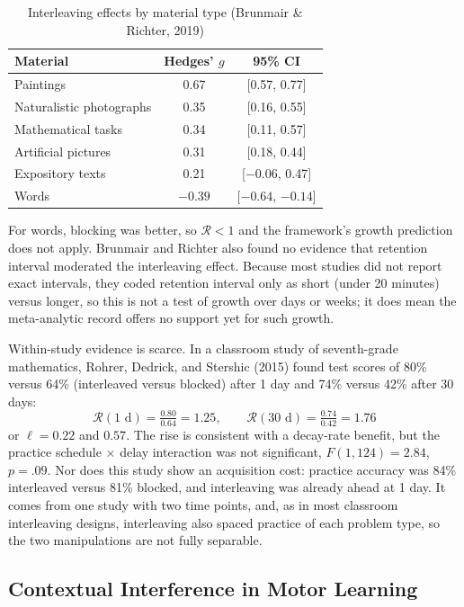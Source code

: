 \documentclass[10pt,twocolumn]{article}
\newcommand{\effr}{\mathcal{R}}
\newcommand{\lr}{\ell}
\begin{document}
\begin{table}[!htbp]
\centering
\caption{Interleaving effects by material type (Brunmair \& Richter, 2019)}
\label{tab:interleaving}
\small
\begin{tabular}{@{}lcc@{}}
\toprule
Material & Hedges' $g$ & 95\% CI \\
\midrule
Paintings & 0.67 & [0.57, 0.77] \\
Naturalistic photographs & 0.35 & [0.16, 0.55] \\
Mathematical tasks & 0.34 & [0.11, 0.57] \\
Artificial pictures & 0.31 & [0.18, 0.44] \\
Expository texts & 0.21 & [$-0.06$, 0.47] \\
Words & $-0.39$ & [$-0.64$, $-0.14$] \\
\bottomrule
\end{tabular}
\end{table}

For words, blocking was better, so $\effr < 1$ and the framework's growth prediction does not apply. Brunmair and Richter also found no evidence that retention interval moderated the interleaving effect. Because most studies did not report exact intervals, they coded retention interval only as short (under 20 minutes) versus longer, so this is not a test of growth over days or weeks; it does mean the meta-analytic record offers no support yet for such growth.

Within-study evidence is scarce. In a classroom study of seventh-grade mathematics, Rohrer, Dedrick, and Stershic (2015) found test scores of 80\% versus 64\% (interleaved versus blocked) after 1 day and 74\% versus 42\% after 30 days:
\begin{equation}
\effr(1\text{ d}) = \tfrac{0.80}{0.64} = 1.25, \qquad \effr(30\text{ d}) = \tfrac{0.74}{0.42} = 1.76
\label{eq:rohrer}
\end{equation}
or $\lr = 0.22$ and $0.57$. The rise is consistent with a decay-rate benefit, but the practice schedule $\times$ delay interaction was not significant, $F(1, 124) = 2.84$, $p = .09$. Nor does this study show an acquisition cost: practice accuracy was 84\% interleaved versus 81\% blocked, and interleaving was already ahead at 1 day. It comes from one study with two time points, and, as in most classroom interleaving designs, interleaving also spaced practice of each problem type, so the two manipulations are not fully separable.

\subsection{Contextual Interference in Motor Learning}
\end{document}
